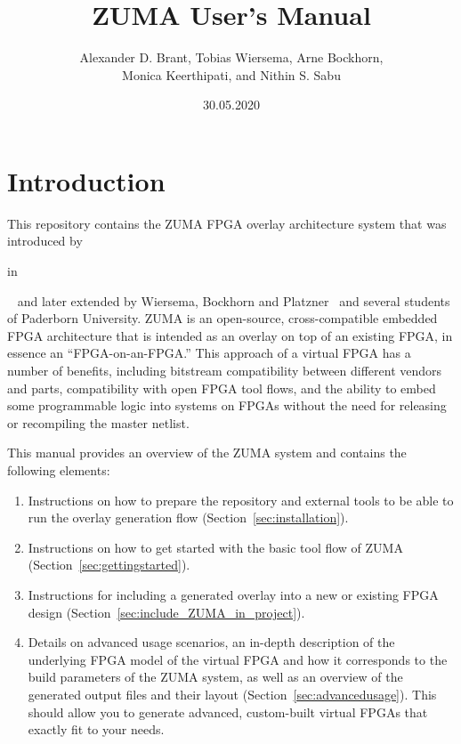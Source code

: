 \documentclass{article}
\begin{document}
\title{ZUMA User's Manual}
\author{Alexander D. Brant, Tobias Wiersema, Arne Bockhorn,\\ Monica Keerthipati, and Nithin S. Sabu}
\date{30.05.2020}
\maketitle
\tableofcontents

\section{Introduction}
This repository contains the ZUMA FPGA overlay architecture system that was introduced by 
\begin{NoHyper}\citeauthor{brantlemieux2012ZUMA} in \citeyear{brantlemieux2012ZUMA}\end{NoHyper}~\cite{brantlemieux2012ZUMA,brant2013MT} and later extended by Wiersema, Bockhorn and Platzner~\cite{wiersemaBP2014ZUMAReconOS,wiersemaBP2016ZUMAReconOS} and several students of Paderborn University.
ZUMA is an open-source, cross-compatible embedded FPGA architecture that is intended as an overlay on top of an existing FPGA, in essence an ``FPGA-on-an-FPGA.''
This approach of a virtual FPGA has a number of benefits, including bitstream compatibility between different vendors and parts, compatibility with open FPGA tool flows, and the ability to embed some programmable logic into systems on FPGAs without the need for releasing or recompiling the master netlist.

This manual provides an overview of the ZUMA system and contains the following elements:
\begin{enumerate}
    \item Instructions on how to prepare the repository  and external tools to be able to run the overlay generation flow (Section~\ref{sec:installation}).
    \item Instructions on how to get started with the basic tool flow of ZUMA (Section~\ref{sec:gettingstarted}).
    \item Instructions for including a generated overlay into a new or existing FPGA design (Section~\ref{sec:include_ZUMA_in_project}).
    \item Details on advanced usage scenarios, an in-depth description of the underlying FPGA model of the virtual FPGA and how it corresponds to the build parameters of the ZUMA system, as well as an overview of the generated output files and their layout (Section~\ref{sec:advancedusage}).
    This should allow you to generate advanced, custom-built virtual FPGAs that exactly fit to your needs.
\end{enumerate}
\end{document}
